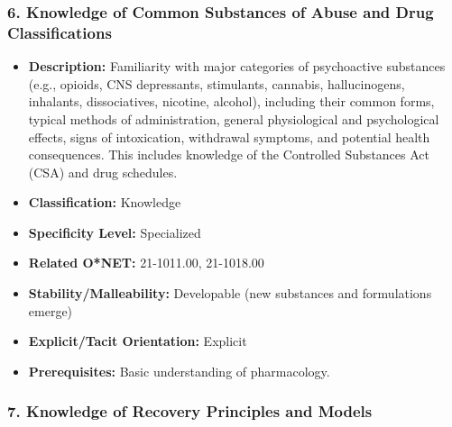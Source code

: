 \documentclass[
  letterpaper,
  DIV=11,
  numbers=noendperiod]{scrartcl}
\providecommand{\tightlist}{%
  \setlength{\itemsep}{0pt}\setlength{\parskip}{0pt}}
\begin{document}
\subsubsection{6. Knowledge of Common Substances of Abuse and Drug
Classifications}\label{knowledge-of-common-substances-of-abuse-and-drug-classifications}

\begin{itemize}
\tightlist
\item
  \textbf{Description:} Familiarity with major categories of
  psychoactive substances (e.g., opioids, CNS depressants, stimulants,
  cannabis, hallucinogens, inhalants, dissociatives, nicotine, alcohol),
  including their common forms, typical methods of administration,
  general physiological and psychological effects, signs of
  intoxication, withdrawal symptoms, and potential health consequences.
  This includes knowledge of the Controlled Substances Act (CSA) and
  drug schedules.
\item
  \textbf{Classification:} Knowledge
\item
  \textbf{Specificity Level:} Specialized
\item
  \textbf{Related O*NET:} 21-1011.00, 21-1018.00
\item
  \textbf{Stability/Malleability:} Developable (new substances and
  formulations emerge)
\item
  \textbf{Explicit/Tacit Orientation:} Explicit
\item
  \textbf{Prerequisites:} Basic understanding of pharmacology.
\end{itemize}

\subsubsection{7. Knowledge of Recovery Principles and
Models}\label{knowledge-of-recovery-principles-and-models}
\end{document}
